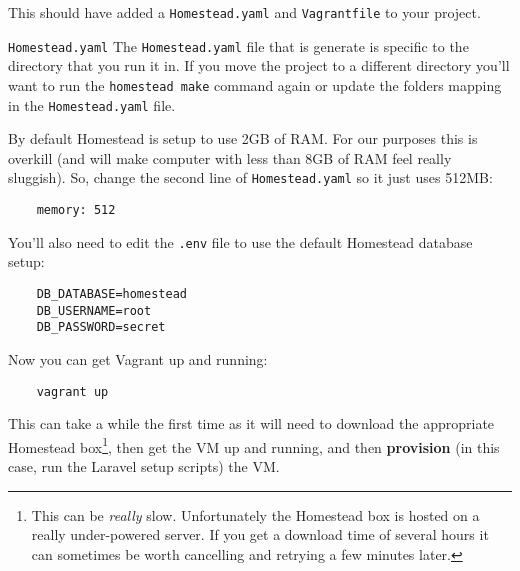 This should have added a \texttt{Homestead.yaml} and \texttt{Vagrantfile} to your project.
\\

\begin{infobox}{\texttt{Homestead.yaml}}
    The \texttt{Homestead.yaml} file that is generate is specific to the directory that you run it in. If you move the project to a different directory you'll want to run the \texttt{homestead make} command again or update the folders mapping in the \texttt{Homestead.yaml} file.
\end{infobox}

By default Homestead is setup to use 2GB of RAM. For our purposes this is overkill (and will make computer with less than 8GB of RAM feel really sluggish). So, change the second line of \texttt{Homestead.yaml} so it just uses 512MB:

\begin{verbatim}
    memory: 512
\end{verbatim}

You'll also need to edit the \texttt{.env} file to use the default Homestead database setup:

\begin{verbatim}
    DB_DATABASE=homestead
    DB_USERNAME=root
    DB_PASSWORD=secret
\end{verbatim}

Now you can get Vagrant up and running:

\begin{verbatim}
    vagrant up
\end{verbatim}

This can take a while the first time as it will need to download the appropriate Homestead box\footnote{This can be \textit{really} slow. Unfortunately the Homestead box is hosted on a really under-powered server. If you get a download time of several hours it can sometimes be worth cancelling and retrying a few minutes later.}, then get the VM up and running, and then \textbf{provision} (in this case, run the Laravel setup scripts) the VM.


\pagebreak

